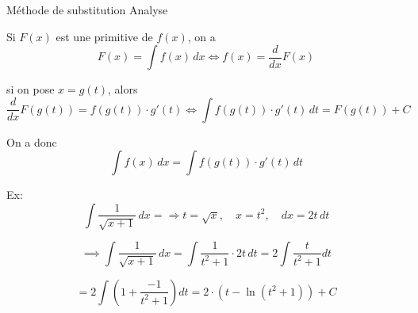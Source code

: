 \documentclass{article}
\begin{document}
\noindent
Méthode de substitution \hfill \textnormal{Analyse}

\medskip

\noindent
Si $F(x)$ est une primitive de $f(x)$, on a 
\[
F(x) = \int f(x) \, dx \iff f(x) = \frac{d}{dx}F(x)
\]

\noindent
si on pose $\boxed{x = g(t)}$, alors
\[
\frac{d}{dx} F(g(t)) = f(g(t)) \cdot g'(t) \iff \int f(g(t)) \cdot g'(t) \, dt = F(g(t)) + C
\]

\noindent
On a donc 
\[
\boxed{\int f(x) \, dx = \int f(g(t)) \cdot g'(t) \, dt}
\]

\bigskip

\noindent
Ex:
\[
\int \frac{1}{\sqrt{x + 1}} \, dx = \Rightarrow t = \sqrt{x}, \quad x = t^2, \quad dx = 2t \, dt
\]

\noindent
\[
\implies \int \frac{1}{\sqrt{x + 1}} \, dx = \int \frac{1}{t^2 + 1} \cdot 2t\, dt = 2 \int \frac{t}{t^2 + 1} dt
\]

\noindent
\[
= 2 \int \left( 1 + \frac{-1}{t^2 + 1} \right) dt = 2 \cdot \left( t - \ln(t^2 + 1) \right) + C
\]
\end{document}
